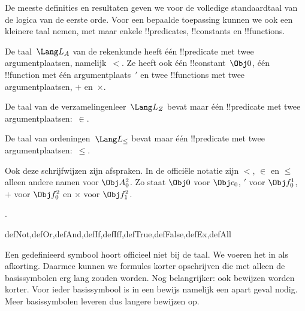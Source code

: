 \documentclass[openany]{memoir}
\begin{document}
De meeste definities en resultaten geven we voor de volledige
standaardtaal van de logica van de eerste orde. Voor een bepaalde
toepassing kunnen we ook een kleinere taal nemen, met maar enkele
!!{predicate}s, !!{constant}s en !!{function}s.

\begin{ex}
De taal~$\Lang L_A$ van de rekenkunde heeft één !!{predicate} met twee
argumentplaatsen, namelijk~$<$. Ze heeft ook één !!{constant}~$\Obj 0$,
één !!{function} met één argumentplaats~$\prime$ en twee !!{function}s
met twee argumentplaatsen, $+$ en~$\times$.
\end{ex}

\begin{ex}
De taal van de verzamelingenleer~$\Lang L_Z$ bevat maar één
!!{predicate} met twee argumentplaatsen:~$\in$.
\end{ex}

\begin{ex}
De taal van ordeningen~$\Lang L_\le$ bevat maar één !!{predicate} met
twee argumentplaatsen:~$\le$.
\end{ex}

Ook deze schrijfwijzen zijn afspraken. In de officiële notatie zijn
$<$, $\in$ en $\le$ alleen andere namen voor $\Obj A^2_0$. Zo staat
$\Obj 0$ voor $\Obj c_0$, $\prime$ voor $\Obj f^1_0$, $+$ voor
$\Obj f^2_0$ en $\times$ voor $\Obj f^2_1$.

.

\begin{tagblock}{defNot,defOr,defAnd,defIf,defIff,defTrue,defFalse,defEx,defAll}
\begin{explain}
Een gedefinieerd symbool hoort officieel niet bij de taal. We voeren
het in als afkorting. Daarmee kunnen we formules korter opschrijven die
met alleen de basissymbolen erg lang zouden worden. Nog belangrijker:
ook bewijzen worden korter. Voor ieder basissymbool is in een bewijs
namelijk een apart geval nodig. Meer basissymbolen leveren dus langere
bewijzen op.
\end{explain}
\end{tagblock}
\end{document}
